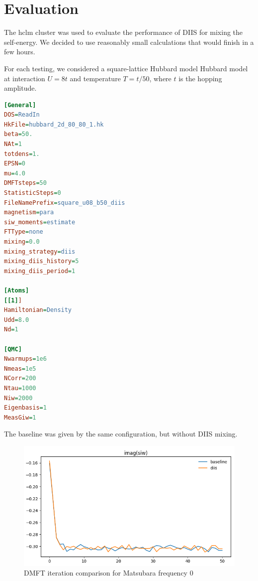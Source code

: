 \chapter{Evaluation}
\label{ch:evaluation}
The hclm cluster was used to evaluate the performance of DIIS for mixing the self-energy. We decided to use reasonably small calculations that would finish in a few hours.

For each testing, we considered a square-lattice Hubbard model Hubbard model at interaction $U=8t$ and temperature $T=t/50$, where $t$ is the hopping amplitude.


\begin{lstlisting}[label=lst:w2dyn_config, language=ini, caption=The w2dynmaics configuration for this case]
[General]
DOS=ReadIn
HkFile=hubbard_2d_80_80_1.hk
beta=50.
NAt=1
totdens=1.
EPSN=0
mu=4.0
DMFTsteps=50
StatisticSteps=0
FileNamePrefix=square_u08_b50_diis
magnetism=para
siw_moments=estimate
FTType=none
mixing=0.0
mixing_strategy=diis
mixing_diis_history=5
mixing_diis_period=1

[Atoms]
[[1]]
Hamiltonian=Density
Udd=8.0
Nd=1

[QMC]
Nwarmups=1e6
Nmeas=1e5
NCorr=200
Ntau=1000
Niw=2000
Eigenbasis=1 
MeasGiw=1
\end{lstlisting}

The baseline was given by the same configuration, but without DIIS mixing.

\begin{figure}[H]
    \centering
    \includegraphics[width=1.0\textwidth]{figures/square_u08_b50_siw_imag.png}
    \caption{DMFT iteration comparison for Matsubara frequency 0}
    \label{fig:eval-diis-1}
\end{figure}

